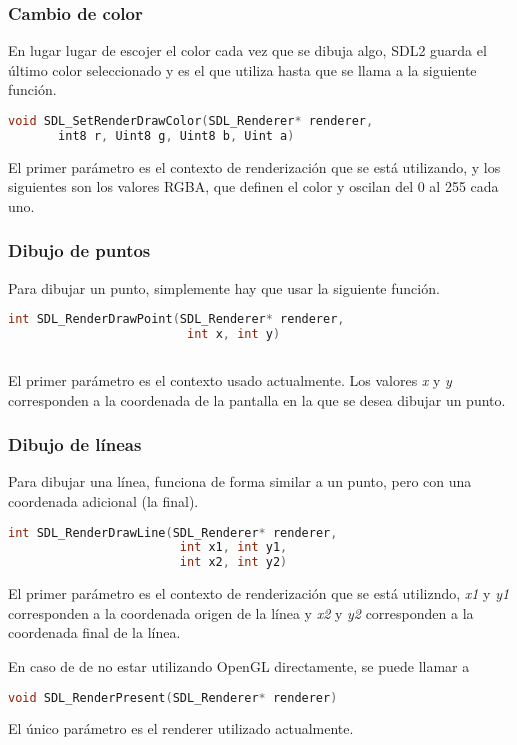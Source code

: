 \subsubsection{Cambio de color}
En lugar lugar de escojer el color cada vez que se dibuja algo, SDL2 guarda el último color seleccionado y es el que utiliza hasta que se llama a la siguiente función.
\begin{lstlisting}[language=C]
  void SDL_SetRenderDrawColor(SDL_Renderer* renderer,
       int8 r, Uint8 g, Uint8 b, Uint a)
\end{lstlisting}
El primer parámetro es el contexto de renderización que se está utilizando, y los siguientes son los valores RGBA, que definen el color y oscilan del 0 al 255 cada uno.

\subsubsection{Dibujo de puntos}
Para dibujar un punto, simplemente hay que usar la siguiente función.
\begin{lstlisting}[language=C]
  int SDL_RenderDrawPoint(SDL_Renderer* renderer,
                         int x, int y)
  
\end{lstlisting}
El primer parámetro es el contexto usado actualmente. Los valores \textit{x} y \textit{y} corresponden a la coordenada de la pantalla en la que se desea dibujar un punto.

\subsubsection{Dibujo de líneas}
Para dibujar una línea, funciona de forma similar a un punto, pero con una coordenada adicional (la final).
\begin{lstlisting}[language=C]
  int SDL_RenderDrawLine(SDL_Renderer* renderer,
                        int x1, int y1,
                        int x2, int y2)
\end{lstlisting}
El primer parámetro es el contexto de renderización que se está utilizndo, \textit{x1} y \textit{y1} corresponden a la coordenada origen de la línea y \textit{x2} y \textit{y2} corresponden a la coordenada final de la línea.


En caso de de no estar utilizando OpenGL directamente, se puede llamar a
\begin{lstlisting}[language=C]
  void SDL_RenderPresent(SDL_Renderer* renderer)
\end{lstlisting}
El único parámetro es el renderer utilizado actualmente.

